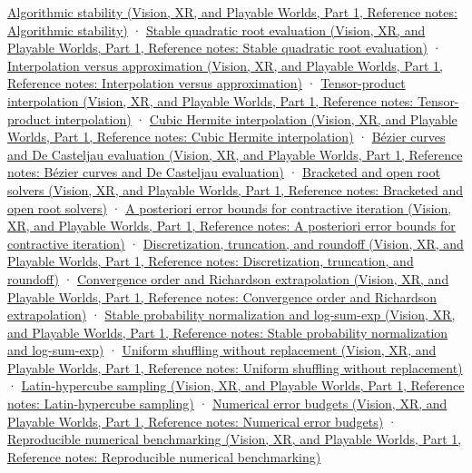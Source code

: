 \href{../07-Vision-XR-and-Playable-Worlds-P01/main.pdf\#nameddest=appendix-aa2bf0d79639}{Algorithmic stability (Vision, XR, and Playable Worlds, Part 1, Reference notes: Algorithmic stability)} · \href{../07-Vision-XR-and-Playable-Worlds-P01/main.pdf\#nameddest=appendix-b9afba7f63e5}{Stable quadratic root evaluation (Vision, XR, and Playable Worlds, Part 1, Reference notes: Stable quadratic root evaluation)} · \href{../07-Vision-XR-and-Playable-Worlds-P01/main.pdf\#nameddest=appendix-0c2a5f69851e}{Interpolation versus approximation (Vision, XR, and Playable Worlds, Part 1, Reference notes: Interpolation versus approximation)} · \href{../07-Vision-XR-and-Playable-Worlds-P01/main.pdf\#nameddest=appendix-0a09b6dfdc86}{Tensor-product interpolation (Vision, XR, and Playable Worlds, Part 1, Reference notes: Tensor-product interpolation)} · \href{../07-Vision-XR-and-Playable-Worlds-P01/main.pdf\#nameddest=appendix-db3aef8f2fd6}{Cubic Hermite interpolation (Vision, XR, and Playable Worlds, Part 1, Reference notes: Cubic Hermite interpolation)} · \href{../07-Vision-XR-and-Playable-Worlds-P01/main.pdf\#nameddest=appendix-ddbec701898c}{Bézier curves and De Casteljau evaluation (Vision, XR, and Playable Worlds, Part 1, Reference notes: Bézier curves and De Casteljau evaluation)} · \href{../07-Vision-XR-and-Playable-Worlds-P01/main.pdf\#nameddest=appendix-f63eb850796d}{Bracketed and open root solvers (Vision, XR, and Playable Worlds, Part 1, Reference notes: Bracketed and open root solvers)} · \href{../07-Vision-XR-and-Playable-Worlds-P01/main.pdf\#nameddest=appendix-d83b0ad1be7f}{A posteriori error bounds for contractive iteration (Vision, XR, and Playable Worlds, Part 1, Reference notes: A posteriori error bounds for contractive iteration)} · \href{../07-Vision-XR-and-Playable-Worlds-P01/main.pdf\#nameddest=appendix-6b0648b2b8e8}{Discretization, truncation, and roundoff (Vision, XR, and Playable Worlds, Part 1, Reference notes: Discretization, truncation, and roundoff)} · \href{../07-Vision-XR-and-Playable-Worlds-P01/main.pdf\#nameddest=appendix-aca80b6bf17a}{Convergence order and Richardson extrapolation (Vision, XR, and Playable Worlds, Part 1, Reference notes: Convergence order and Richardson extrapolation)} · \href{../07-Vision-XR-and-Playable-Worlds-P01/main.pdf\#nameddest=appendix-d580b422240f}{Stable probability normalization and log-sum-exp (Vision, XR, and Playable Worlds, Part 1, Reference notes: Stable probability normalization and log-sum-exp)} · \href{../07-Vision-XR-and-Playable-Worlds-P01/main.pdf\#nameddest=appendix-184fcc411663}{Uniform shuffling without replacement (Vision, XR, and Playable Worlds, Part 1, Reference notes: Uniform shuffling without replacement)} · \href{../07-Vision-XR-and-Playable-Worlds-P01/main.pdf\#nameddest=appendix-1c5e85693a06}{Latin-hypercube sampling (Vision, XR, and Playable Worlds, Part 1, Reference notes: Latin-hypercube sampling)} · \href{../07-Vision-XR-and-Playable-Worlds-P01/main.pdf\#nameddest=appendix-31b8c295e05f}{Numerical error budgets (Vision, XR, and Playable Worlds, Part 1, Reference notes: Numerical error budgets)} · \href{../07-Vision-XR-and-Playable-Worlds-P01/main.pdf\#nameddest=appendix-b9db93e28371}{Reproducible numerical benchmarking (Vision, XR, and Playable Worlds, Part 1, Reference notes: Reproducible numerical benchmarking)}

